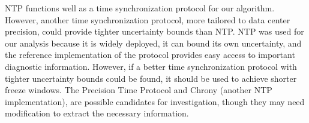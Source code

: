 NTP functions well as a time synchronization protocol for our algorithm. 
However, another time synchronization protocol, more tailored to data center precision, could provide tighter uncertainty bounds than NTP. NTP
was used for our analysis because it is widely deployed, it can bound
its own uncertainty, and the reference implementation of the protocol
provides easy access to important diagnostic information. However, if a better time synchronization protocol with tighter uncertainty bounds could be found, it should be used to achieve shorter freeze windows. The Precision Time Protocol and Chrony (another NTP implementation), are possible candidates for investigation, though they may need modification to extract the necessary information.
